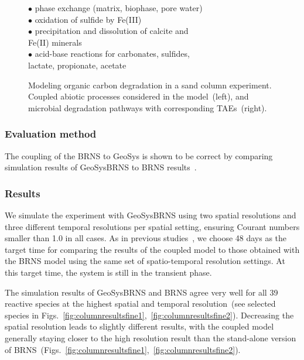 \begin{figure}[h!]
$\bullet$ phase exchange (matrix, biophase, pore water)\\
$\bullet$ oxidation of sulfide by Fe(III)\\
$\bullet$ precipitation and dissolution of calcite and\\
Fe(II) minerals\\
$\bullet$ acid-base reactions for carbonates, sulfides,\\
lactate, propionate, acetate

\vspace{-2.75cm}
\hspace{8cm}
\caption{
Modeling organic carbon degradation in a sand column experiment.  Coupled
abiotic processes considered in the model~(left), and microbial degradation
pathways with corresponding TAEs~(right).
}
\label{fig:sandnetwork}
\end{figure}

\subsubsection*{Evaluation method}

The coupling of the BRNS to GeoSys is shown to be correct by comparing
simulation results of GeoSysBRNS to BRNS results~\cite{Centler2009}.

\subsubsection*{Results}

We simulate the experiment with GeoSysBRNS using two spatial resolutions and
three different temporal resolutions per spatial setting, ensuring Courant
numbers smaller than 1.0 in all cases.  As in previous
studies~\cite{Thullner2005,Schaefer1998b}, we choose 48 days as the target
time for comparing the results of the coupled model to those obtained with the
BRNS model using the same set of spatio-temporal resolution settings.  At this
target time, the system is still in the transient phase. 

The simulation results of GeoSysBRNS and BRNS agree very well for all 39
reactive species at the highest spatial and temporal resolution~(see selected
species in Figs.~\ref{fig:columnresultsfine1},~\ref{fig:columnresultsfine2}).
Decreasing the spatial resolution leads to slightly different results, with the
coupled model generally staying closer to the high resolution result than the
stand-alone version of
BRNS~(Figs.~\ref{fig:columnresultsfine1},~\ref{fig:columnresultsfine2}).


